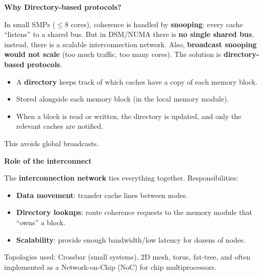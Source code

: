 \highspace
\begin{flushleft}
    \textcolor{Green3}{ \textbf{Why Directory-based protocols?}}
\end{flushleft}
In small SMPs ($\le 8$ cores), coherence is handled by \textbf{snooping}: every cache ``listens'' to a shared bus. But in DSM/NUMA there is \textbf{no single shared bus}, instead, there is a scalable interconnection network. Also, \textbf{broadcast snooping would not scale} (too much traffic, too many cores). The solution is \textbf{directory-based protocols}.
\begin{itemize}
    \item A \textbf{directory} keeps track of which caches have a copy of each memory block.
    \item Stored alongside each memory block (in the local memory module).
    \item When a block is read or written, the directory is updated, and only the relevant caches are notified.
\end{itemize}
This avoids global broadcasts.

\highspace
\begin{flushleft}
    \textcolor{Green3}{ \textbf{Role of the interconnect}}
\end{flushleft}
The \textbf{interconnection network} ties everything together. Responsibilities:
\begin{itemize}
    \item \textbf{Data movement}: transfer cache lines between nodes.
    \item \textbf{Directory lookups}: route coherence requests to the memory module that ``owns'' a block.
    \item \textbf{Scalability}: provide enough bandwidth/low latency for dozens of nodes.
\end{itemize}
Topologies used: Crossbar (small systems), 2D mesh, torus, fat-tree, and often implemented as a Network-on-Chip (NoC) for chip multiprocessors.

